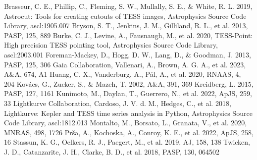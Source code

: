 \documentclass[RNAAS]{aastex631}
\begin{document}
\begin{thebibliography}{}
 Brasseur, C. E., Phillip, C., Fleming, S. W., Mullally, S. E., \& White, R. L. 2019, Astrocut: Tools for creating cutouts of TESS images, Astrophysics Source Code Library, ascl:1905.007
 Bryson, S. T., Jenkins, J. M., Gilliland, R. L., et al. 2013, PASP, 125, 889
 Burke, C. J., Levine, A., Fausnaugh, M., et al. 2020, TESS-Point: High precision TESS pointing tool, Astrophysics Source Code Library, ascl:2003.001
 Foreman-Mackey, D., Hogg, D. W., Lang, D., \& Goodman, J. 2013, PASP, 125, 306
 Gaia Collaboration, Vallenari, A., Brown, A. G. A., et al. 2023, A\&A, 674, A1
 Huang, C. X., Vanderburg, A., P\'al, A., et al. 2020, RNAAS, 4, 204
 Kov\'acs, G., Zucker, S., \& Mazeh, T. 2002, A\&A, 391, 369
 Kreidberg, L. 2015, PASP, 127, 1161
 Kunimoto, M., Daylan, T., Guerrero, N., et al. 2022, ApJS, 259, 33
 Lightkurve Collaboration, Cardoso, J. V. d. M., Hedges, C., et al. 2018, Lightkurve: Kepler and TESS time series analysis in Python, Astrophysics Source Code Library, ascl:1812.013
 Montalto, M., Borsato, L., Granata, V., et al. 2020, MNRAS, 498, 1726
 Pr\v{s}a, A., Kochoska, A., Conroy, K. E., et al. 2022, ApJS, 258, 16
 Stassun, K. G., Oelkers, R. J., Paegert, M., et al. 2019, AJ, 158, 138
 Twicken, J. D., Catanzarite, J. H., Clarke, B. D., et al. 2018, PASP, 130, 064502
\end{thebibliography}
\end{document}
